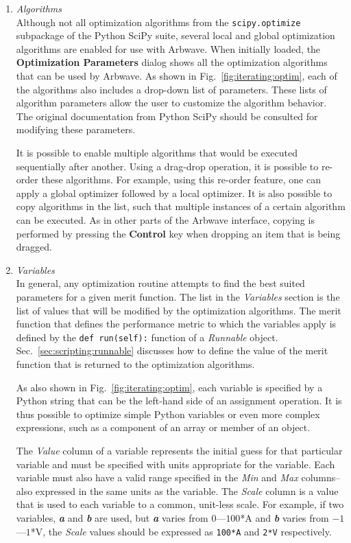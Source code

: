 \begin{enumerate}
  \item \textit{Algorithms}\\
    Although not all optimization algorithms from the \texttt{scipy.optimize}
    subpackage of the Python SciPy suite, several local and global optimization
    algorithms are enabled for use with Arbwave.  When initially loaded, the
    \textbf{Optimization Parameters} dialog shows all the optimization
    algorithms that can be used by Arbwave.  As shown in
    Fig.~\ref{fig:iterating:optim}, each of the algorithms also includes a
    drop-down list of parameters.  These lists of algorithm parameters allow the
    user to customize the algorithm behavior.  The original documentation from
    Python SciPy should be consulted for modifying these parameters.

    It is possible to enable multiple algorithms that would be executed
    sequentially after another.  Using a drag-drop operation, it is possible to
    re-order these algorithms.  For example, using this re-order feature, one
    can apply a global optimizer followed by a local optimizer.
    It is also possible to copy algorithms in the list, such that multiple
    instances of a certain algorithm can be executed.  As in other parts of the
    Arbwave interface, copying is performed by pressing the \textbf{Control} key
    when dropping an item that is being dragged.

  \item \textit{Variables}\\
    In general, any optimization routine attempts to find the best suited
    parameters for a given merit function.  The list in the \textit{Variables}
    section is the list of values that will be modified by the optimization
    algorithms.  The merit function that defines the performance metric to which
    the variables apply is defined by the \texttt{def run(self):} function of
    a \textit{Runnable} object.  Sec.~\ref{sec:scripting:runnable} discusses how
    to define the value of the merit function that is returned to the
    optimization algorithms.

    As also shown in Fig.~\ref{fig:iterating:optim}, each variable is specified
    by a Python string that can be the left-hand side of an assignment
    operation.  It is thus possible to optimize simple Python variables or even
    more complex expressions, such as a component of an array or member of an
    object.
    
    The \textit{Value} column of a variable represents the initial guess for
    that particular variable and must be specified with units appropriate for
    the variable.  Each variable must also have a valid range specified in the
    \textit{Min} and \textit{Max} columns--also expressed in the same units as
    the variable.  The \textit{Scale} column is a value that is used to each
    variable to a common, unit-less scale.  For example, if two variables,
    \textbf{\textit{a}} and \textbf{\textit{b}} are used, but
    \textbf{\textit{a}} varies from $0$---$100$*A and 
    \textbf{\textit{b}} varies from $-1$---$1$*V, the \textit{Scale} values should
    be expressed as \texttt{100*A} and \texttt{2*V} respectively.


\end{enumerate}
